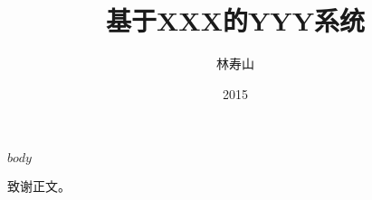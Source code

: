\documentclass[format=draft,language=chinese,degree=master]{hustthesis}
\title{基于XXX的YYY系统}{A YYY System based on XXX}
\author
{林寿山}{Lin Shoushan}
\date{2015}{12}{12}
\begin{document}
\frontmatter
\maketitle
\makeabstract
\tableofcontents
\listoffigures
\listoftables
\mainmatter

$body$

\backmatter

\begin{ack}
致谢正文。
\end{ack}


\end{document}
